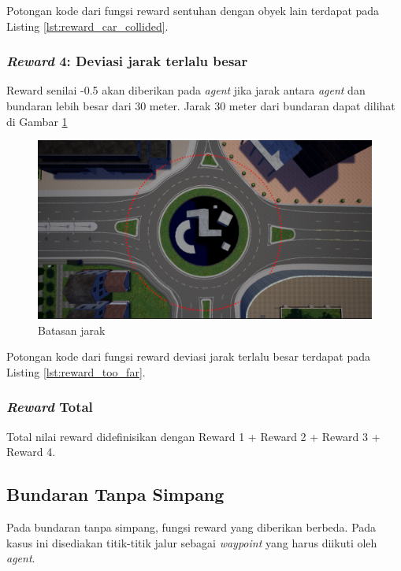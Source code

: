 Potongan kode dari fungsi reward sentuhan dengan obyek lain terdapat pada Listing \ref{lst:reward_car_collided}.



\subsubsection{\textit{Reward} 4: Deviasi jarak terlalu besar}
Reward senilai -0.5 akan diberikan pada \textit{agent} jika jarak antara \textit{agent} dan bundaran lebih besar dari 30 meter. Jarak 30 meter dari bundaran dapat dilihat di Gambar \ref{fig:punishment_lane_line}

\begin{figure}[H] 
	\centering
	\includegraphics[width=1\linewidth]{images/punishment_lane_line}
	\caption{Batasan jarak}
	\label{fig:punishment_lane_line}
\end{figure}

Potongan kode dari fungsi reward deviasi jarak terlalu besar terdapat pada Listing \ref{lst:reward_too_far}.




\subsubsection{\textit{Reward }Total}
Total nilai reward didefinisikan dengan Reward 1 + Reward 2 + Reward 3 + Reward 4.

\subsection{Bundaran Tanpa Simpang}
Pada bundaran tanpa simpang, fungsi reward yang diberikan berbeda. Pada kasus ini disediakan titik-titik jalur sebagai \textit{waypoint} yang harus diikuti oleh \textit{agent}.

